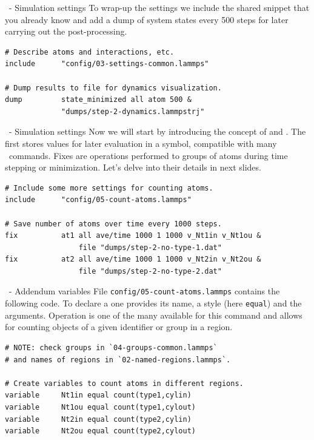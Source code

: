 \begin{frame}[fragile]{\secname}{\subsecname\ - Simulation settings}
To wrap-up the settings we include the shared snippet that you already know and add a dump of system states every 500 steps for later carrying out the post-processing.

\vspace{0.5cm}

\begin{lstlisting}[language=LAMMPS,basicstyle=\small]
# Describe atoms and interactions, etc.
include      "config/03-settings-common.lammps"

# Dump results to file for dynamics visualization.
dump         state_minimized all atom 500 &
             "dumps/step-2-dynamics.lammpstrj"
\end{lstlisting}
\end{frame}

\begin{frame}[fragile]{\secname}{\subsecname\ - Simulation settings}
Now we will start by introducing the concept of  and . The first stores values for later evaluation in a symbol, compatible with many \LAMMPS\ commands. Fixes are operations performed to groups of atoms during time stepping or minimization. Let's delve into their details in next slides.

\vspace{0.5cm}

\begin{lstlisting}[language=LAMMPS,basicstyle=\small]
# Include some more settings for counting atoms.
include      "config/05-count-atoms.lammps"

# Save number of atoms over time every 1000 steps.
fix          at1 all ave/time 1000 1 1000 v_Nt1in v_Nt1ou &
                 file "dumps/step-2-no-type-1.dat"
fix          at2 all ave/time 1000 1 1000 v_Nt2in v_Nt2ou &
                 file "dumps/step-2-no-type-2.dat"
\end{lstlisting}
\end{frame}

\begin{frame}[fragile]{\secname}{\subsecname\ - Addendum variables}
File \Verb|config/05-count-atoms.lammps| contains the following code. To declare a  one provides its name, a style (here \Verb|equal|) and the arguments. Operation  is one of the many available for this command and allows for counting objects of a given identifier or group in a region.

\vspace{0.5cm}

\begin{lstlisting}[language=LAMMPS,basicstyle=\small]
# NOTE: check groups in `04-groups-common.lammps`
# and names of regions in `02-named-regions.lammps`.

# Create variables to count atoms in different regions.
variable     Nt1in equal count(type1,cylin)
variable     Nt1ou equal count(type1,cylout)
variable     Nt2in equal count(type2,cylin)
variable     Nt2ou equal count(type2,cylout)
\end{lstlisting}
\end{frame}


